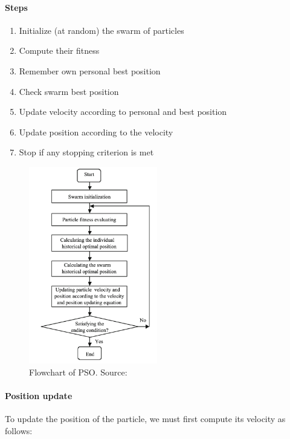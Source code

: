     \paragraph{Steps}
        \begin{enumerate}
            \item Initialize (at random) the swarm of particles
            \item Compute their fitness
            \item Remember own personal best position
            \item Check swarm best position
            \item Update velocity according to personal and best position
            \item Update position according to the velocity
            \item Stop if any stopping criterion is met
        \end{enumerate}

        \begin{figure}[H]
            \centering
            \includegraphics[width=0.5\textwidth]{img/pso.png}
            \caption{Flowchart of PSO. Source: \cite{pso}}
        \end{figure}

    \paragraph{Position update}
        To update the position of the particle, we must first compute its velocity as follows:

